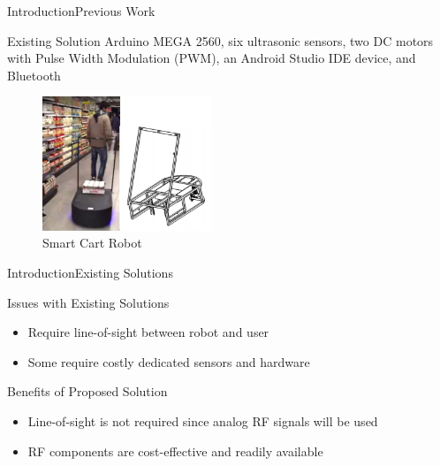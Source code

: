 \documentclass{beamer}
\begin{document}

\begin{frame}{Introduction}{Previous Work}
  \begin{block}{Existing Solution}
    Arduino MEGA 2560, six ultrasonic sensors, two DC motors with Pulse Width Modulation (PWM), an Android Studio IDE device, and Bluetooth~\cite{Rawashdeh2017-Person}
  \end{block}
    \begin{figure}[b]
        \centering
        \includegraphics[width=0.45\textwidth]{figs/img/SmartCart}
        \caption{Smart Cart Robot}
    \end{figure}
\end{frame}


\begin{frame}{Introduction}{Existing Solutions}
  \begin{block}{Issues with Existing Solutions}
    \begin{itemize}
      \item Require line-of-sight between robot and user
      \item Some require costly dedicated sensors and hardware
    \end{itemize}
  \end{block}
  \pause
  \begin{block}{Benefits of Proposed Solution}
    \begin{itemize}
      \item Line-of-sight is not required since analog RF signals will be used
      \item RF components are cost-effective and readily available
    \end{itemize}
  \end{block}
\end{frame}

\end{document}
